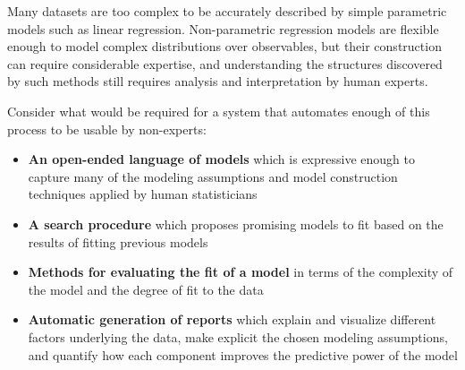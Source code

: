 \documentclass[letterpaper]{article}
\def\eg{e.g.\ }
\begin{document}
Many datasets are too complex to be accurately described by simple parametric models such as linear regression.
Non-parametric regression models are flexible enough to model complex distributions over observables, but their construction can require considerable expertise, and understanding the structures discovered by such methods still requires analysis and interpretation by human experts.


Consider what would be required for a system that automates enough of this process to be usable by non-experts:
\begin{itemize}
\item {\bf An open-ended language of models} which is expressive enough to capture many of the modeling assumptions and model construction techniques applied by human statisticians
\item {\bf A search procedure} which proposes promising models to fit based on the results of fitting previous models
\item {\bf Methods for evaluating the fit of a model} in terms of the complexity of the model and the degree of fit to the data
\item {\bf Automatic generation of reports} which explain and visualize different factors underlying the data, make explicit the chosen modeling assumptions, and quantify how each component improves the predictive power of the model
\end{itemize}
\end{document}
